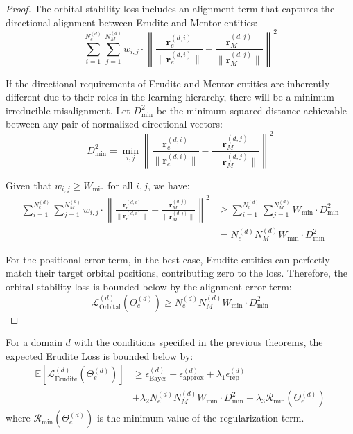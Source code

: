 \begin{proof}
The orbital stability loss includes an alignment term that captures the directional alignment between Erudite and Mentor entities:
\begin{equation}
\sum_{i=1}^{N_e^{(d)}} \sum_{j=1}^{N_M^{(d)}} w_{i,j} \cdot \left\|\frac{\mathbf{r}_e^{(d,i)}}{\|\mathbf{r}_e^{(d,i)}\|} - \frac{\mathbf{r}_M^{(d,j)}}{\|\mathbf{r}_M^{(d,j)}\|}\right\|^2
\end{equation}

If the directional requirements of Erudite and Mentor entities are inherently different due to their roles in the learning hierarchy, there will be a minimum irreducible misalignment. Let $D_{\text{min}}^2$ be the minimum squared distance achievable between any pair of normalized directional vectors:
\begin{equation}
D_{\text{min}}^2 = \min_{i,j} \left\|\frac{\mathbf{r}_e^{(d,i)}}{\|\mathbf{r}_e^{(d,i)}\|} - \frac{\mathbf{r}_M^{(d,j)}}{\|\mathbf{r}_M^{(d,j)}\|}\right\|^2
\end{equation}

Given that $w_{i,j} \geq W_{\text{min}}$ for all $i, j$, we have:
\begin{align}
\sum_{i=1}^{N_e^{(d)}} \sum_{j=1}^{N_M^{(d)}} w_{i,j} \cdot \left\|\frac{\mathbf{r}_e^{(d,i)}}{\|\mathbf{r}_e^{(d,i)}\|} - \frac{\mathbf{r}_M^{(d,j)}}{\|\mathbf{r}_M^{(d,j)}\|}\right\|^2 &\geq \sum_{i=1}^{N_e^{(d)}} \sum_{j=1}^{N_M^{(d)}} W_{\text{min}} \cdot D_{\text{min}}^2 \\
&= N_e^{(d)}N_M^{(d)}W_{\text{min}} \cdot D_{\text{min}}^2
\end{align}

For the positional error term, in the best case, Erudite entities can perfectly match their target orbital positions, contributing zero to the loss. Therefore, the orbital stability loss is bounded below by the alignment error term:
\begin{equation}
\mathcal{L}_{\text{Orbital}}^{(d)}(\Theta_e^{(d)}) \geq N_e^{(d)}N_M^{(d)}W_{\text{min}} \cdot D_{\text{min}}^2
\end{equation}
\end{proof}

\begin{theorem}
For a domain $d$ with the conditions specified in the previous theorems, the expected Erudite Loss is bounded below by:
\begin{align}
\mathbb{E}[\mathcal{L}_{\text{Erudite}}^{(d)}(\Theta_e^{(d)})] &\geq \epsilon_{\text{Bayes}}^{(d)} + \epsilon_{\text{approx}}^{(d)} + \lambda_1 \epsilon_{\text{rep}}^{(d)} \\
&+ \lambda_2 N_e^{(d)}N_M^{(d)}W_{\text{min}} \cdot D_{\text{min}}^2 + \lambda_3 \mathcal{R}_{\text{min}}(\Theta_e^{(d)})
\end{align}
where $\mathcal{R}_{\text{min}}(\Theta_e^{(d)})$ is the minimum value of the regularization term.
\end{theorem}

